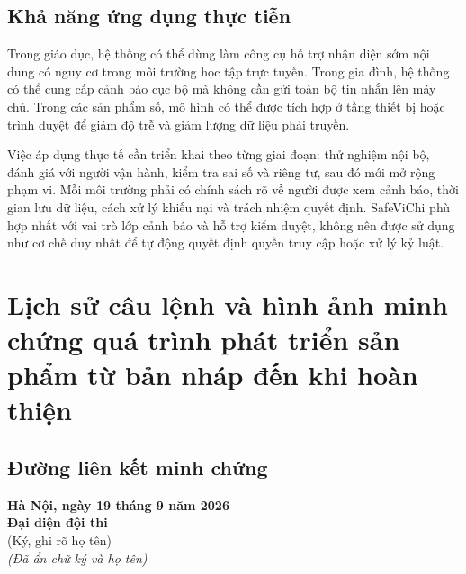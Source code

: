\documentclass[12pt,a4paper]{article}
\begin{document}
\subsection{Khả năng ứng dụng thực tiễn}
Trong giáo dục, hệ thống có thể dùng làm công cụ hỗ trợ nhận diện sớm nội dung có nguy cơ trong môi trường học tập trực tuyến. Trong gia đình, hệ thống có thể cung cấp cảnh báo cục bộ mà không cần gửi toàn bộ tin nhắn lên máy chủ. Trong các sản phẩm số, mô hình có thể được tích hợp ở tầng thiết bị hoặc trình duyệt để giảm độ trễ và giảm lượng dữ liệu phải truyền.

Việc áp dụng thực tế cần triển khai theo từng giai đoạn: thử nghiệm nội bộ, đánh giá với người vận hành, kiểm tra sai số và riêng tư, sau đó mới mở rộng phạm vi. Mỗi môi trường phải có chính sách rõ về người được xem cảnh báo, thời gian lưu dữ liệu, cách xử lý khiếu nại và trách nhiệm quyết định. SafeViChi phù hợp nhất với vai trò lớp cảnh báo và hỗ trợ kiểm duyệt, không nên được sử dụng như cơ chế duy nhất để tự động quyết định quyền truy cập hoặc xử lý kỷ luật.

\section{Lịch sử câu lệnh và hình ảnh minh chứng quá trình phát triển sản phẩm từ bản nháp đến khi hoàn thiện}
\subsection{Đường liên kết minh chứng}
\begin{center}
\end{center}

\begin{flushright}
  \begin{minipage}{0.68\textwidth}
    \centering
    \vspace{8mm}
    \textbf{Hà Nội, ngày 19 tháng 9 năm 2026}\\
    \textbf{Đại diện đội thi}\\[1mm]
    (Ký, ghi rõ họ tên)\\[1mm]
    \textit{(Đã ẩn chữ ký và họ tên)}
  \end{minipage}
\end{flushright}
\end{document}
